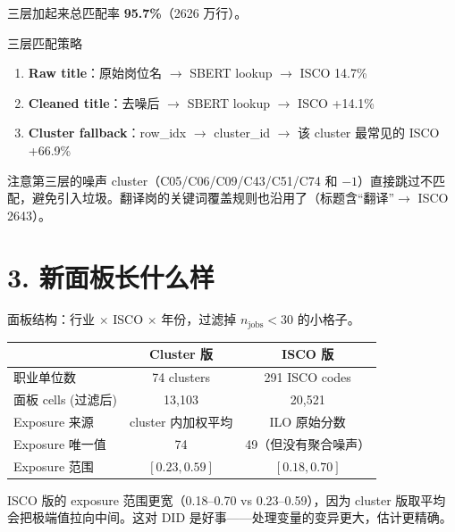 \documentclass[12pt,a4paper]{article}
\begin{document}
三层加起来总匹配率 \textbf{95.7\%}（2626 万行）。

\begin{defbox}{三层匹配策略}
\begin{enumerate}
  \item \textbf{Raw title}：原始岗位名 $\rightarrow$ SBERT lookup $\rightarrow$ ISCO \hfill 14.7\%
  \item \textbf{Cleaned title}：去噪后 $\rightarrow$ SBERT lookup $\rightarrow$ ISCO \hfill +14.1\%
  \item \textbf{Cluster fallback}：row\_idx $\rightarrow$ cluster\_id $\rightarrow$ 该 cluster 最常见的 ISCO \hfill +66.9\%
\end{enumerate}

\medskip
注意第三层的噪声 cluster（C05/C06/C09/C43/C51/C74 和 $-1$）直接跳过不匹配，避免引入垃圾。翻译岗的关键词覆盖规则也沿用了（标题含“翻译”$\rightarrow$ ISCO 2643）。
\end{defbox}

\bigskip

\section*{3. 新面板长什么样}

面板结构：行业 $\times$ ISCO $\times$ 年份，过滤掉 $n_{\text{jobs}} < 30$ 的小格子。

\begin{center}
\small
\begin{tabular}{lcc}
\toprule
 & Cluster 版 & ISCO 版 \\
\midrule
职业单位数 & 74 clusters & 291 ISCO codes \\
面板 cells (过滤后) & 13{,}103 & 20{,}521 \\
Exposure 来源 & cluster 内加权平均 & ILO 原始分数 \\
Exposure 唯一值 & 74 & 49（但没有聚合噪声） \\
Exposure 范围 & $[0.23, 0.59]$ & $[0.18, 0.70]$ \\
\bottomrule
\end{tabular}
\end{center}

ISCO 版的 exposure 范围更宽（0.18--0.70 vs 0.23--0.59），因为 cluster 版取平均会把极端值拉向中间。这对 DID 是好事——处理变量的变异更大，估计更精确。

\bigskip

\end{document}
